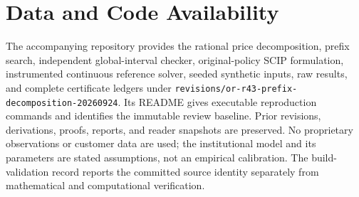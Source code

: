 \section*{Data and Code Availability}
The accompanying repository provides the rational price decomposition, prefix search, independent global-interval checker, original-policy SCIP formulation, instrumented continuous reference solver, seeded synthetic inputs, raw results, and complete certificate ledgers under \nolinkurl{revisions/or-r43-prefix-decomposition-20260924}. Its README gives executable reproduction commands and identifies the immutable review baseline. Prior revisions, derivations, proofs, reports, and reader snapshots are preserved. No proprietary observations or customer data are used; the institutional model and its parameters are stated assumptions, not an empirical calibration. The build-validation record reports the committed source identity separately from mathematical and computational verification.
